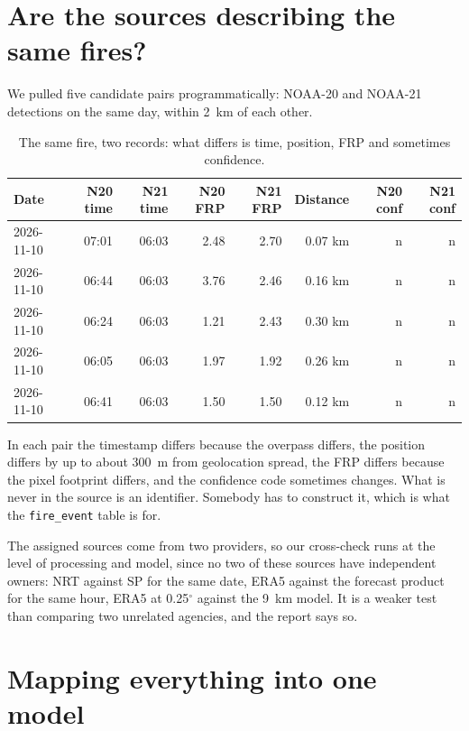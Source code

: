 \documentclass[11pt,a4paper]{article}
\newcommand{\code}[1]{\texttt{\small #1}}
\begin{document}
\section{Are the sources describing the same fires?}

We pulled five candidate pairs programmatically: NOAA-20 and NOAA-21 detections on the same day,
within 2~km of each other.

\begin{table}[h]
\centering
\small
\begin{tabular}{lrrrrrrr}
\toprule
\textbf{Date} & \textbf{N20 time} & \textbf{N21 time} & \textbf{N20 FRP} & \textbf{N21 FRP} & \textbf{Distance} & \textbf{N20 conf} & \textbf{N21 conf} \\
\midrule
2026-11-10 & 07:01 & 06:03 & 2.48 & 2.70 & 0.07 km & n & n \\
2026-11-10 & 06:44 & 06:03 & 3.76 & 2.46 & 0.16 km & n & n \\
2026-11-10 & 06:24 & 06:03 & 1.21 & 2.43 & 0.30 km & n & n \\
2026-11-10 & 06:05 & 06:03 & 1.97 & 1.92 & 0.26 km & n & n \\
2026-11-10 & 06:41 & 06:03 & 1.50 & 1.50 & 0.12 km & n & n \\
\bottomrule
\end{tabular}
\caption{The same fire, two records: what differs is time, position, FRP and sometimes confidence.}
\end{table}

In each pair the timestamp differs because the overpass differs, the position differs by up to about
300~m from geolocation spread, the FRP differs because the pixel footprint differs, and the
confidence code sometimes changes. What is never in the source is an identifier. Somebody has to
construct it, which is what the \code{fire\_event} table is for.

The assigned sources come from two providers, so our cross-check runs at the level of processing and model, since no two of these sources have
independent owners: NRT against SP for the same date, ERA5 against the
forecast product for the same hour, ERA5 at 0.25$^\circ$ against the 9~km model. It is a weaker test
than comparing two unrelated agencies, and the report says so.

\section{Mapping everything into one model}
\end{document}
